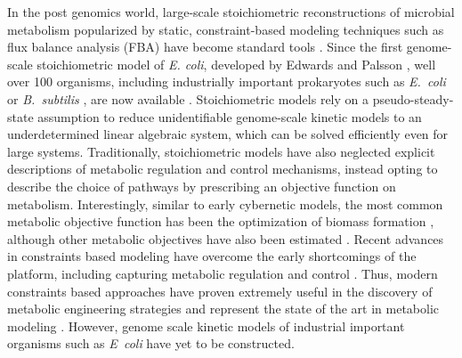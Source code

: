 \documentclass[12pt]{article}
\begin{document}
In the post genomics world, large-scale stoichiometric reconstructions of microbial metabolism popularized by static, constraint-based modeling techniques such as flux balance analysis (FBA)
have become standard tools \citep{2012_lewis_palsson_NatRevMicrobio}.
Since the first genome-scale stoichiometric model of \textit{E. coli}, developed by Edwards and Palsson \citep{2000_edwards_palsson_PNAS}, 
well over 100 organisms, including industrially important prokaryotes such as \emph{E.~coli} \citep{Feist:2007aa} or \emph{B.~subtilis} \citep{Oh:2007aa}, 
are now available \citep{2009_feist_palsson_NatRevMicrobio}.
Stoichiometric models rely on a pseudo-steady-state assumption to reduce unidentifiable genome-scale kinetic models to an underdetermined linear algebraic system, 
which can be solved efficiently even for large systems.  
Traditionally, stoichiometric models have also neglected explicit descriptions of metabolic regulation and control mechanisms, 
instead opting to describe the choice of pathways by prescribing an objective function on metabolism. 
Interestingly, similar to early cybernetic models, the most common metabolic objective function has been the optimization of biomass formation \citep{2002_ibarra_edwards_palsson_Nat}, 
although other metabolic objectives have also been estimated \citep{2007_schuetz_sauer_MolSysBio}. 
Recent advances in constraints based modeling have overcome the early shortcomings of the platform, including capturing metabolic regulation and control \citep{2013_hyduke_lewis_palsson_MolBioSys}.
Thus, modern constraints based approaches have proven extremely useful in the discovery of metabolic engineering strategies and represent the state of the art in metabolic modeling \citep{2013_mccloskey_palsson_feist_MolSysBio, 2012_zomorrodi_maranas_MetaEng}. However, genome scale kinetic models of industrial important organisms such as \textit{E~coli} have yet to
be constructed.
\end{document}
